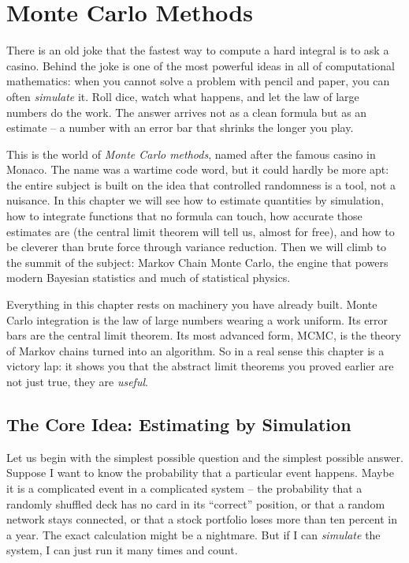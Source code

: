 \chapter{Monte Carlo Methods}

There is an old joke that the fastest way to compute a hard integral is to ask
a casino. Behind the joke is one of the most powerful ideas in all of
computational mathematics: when you cannot solve a problem with pencil and
paper, you can often \emph{simulate} it. Roll dice, watch what happens, and let
the law of large numbers do the work. The answer arrives not as a clean formula
but as an estimate -- a number with an error bar that shrinks the longer you
play.

This is the world of \emph{Monte Carlo methods}, named after the famous casino
in Monaco. The name was a wartime code word, but it could hardly be more apt:
the entire subject is built on the idea that controlled randomness is a tool,
not a nuisance. In this chapter we will see how to estimate quantities by
simulation, how to integrate functions that no formula can touch, how accurate
those estimates are (the central limit theorem will tell us, almost for free),
and how to be cleverer than brute force through variance reduction. Then we will
climb to the summit of the subject: Markov Chain Monte Carlo, the engine that
powers modern Bayesian statistics and much of statistical physics.

Everything in this chapter rests on machinery you have already built. Monte
Carlo integration is the law of large numbers wearing a work uniform. Its error
bars are the central limit theorem. Its most advanced form, MCMC, is the theory
of Markov chains turned into an algorithm. So in a real sense this chapter is a
victory lap: it shows you that the abstract limit theorems you proved earlier
are not just true, they are \emph{useful}.

\section{The Core Idea: Estimating by Simulation}
\label{ch35:core-idea}

Let us begin with the simplest possible question and the simplest possible
answer. Suppose I want to know the probability that a particular event happens.
Maybe it is a complicated event in a complicated system -- the probability that
a randomly shuffled deck has no card in its ``correct'' position, or that a
random network stays connected, or that a stock portfolio loses more than ten
percent in a year. The exact calculation might be a nightmare. But if I can
\emph{simulate} the system, I can just run it many times and count.

